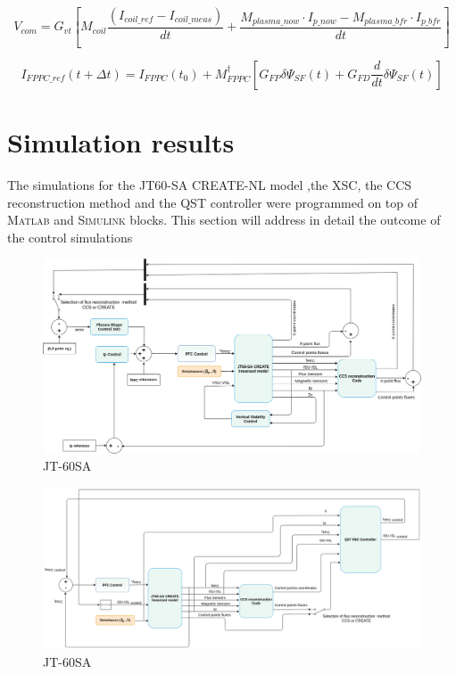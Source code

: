 \begin{equation}
V_{com}=G_{vt}\left[M_{coil}\frac{(I_{coil\_ref}-I_{coil\_meas})}{dt}+ \frac{M_{plasma\_now} \cdot I_{p\_now} - M_{plasma\_ bfr} \cdot I_{p\_bfr}}{dt}\right]
\end{equation}

\begin{equation}
I_{FPPC\_ref}(t+\Delta t)=I_{FPPC}(t_0)+ M^\dagger_{FPPC}\left[G_{FP}\delta \Psi_{SF}(t) + G_{FD}\frac{d}{dt}\delta\Psi_{SF}(t) \right]
\end{equation}





\section{Simulation results}	

 The simulations for  the JT60-SA CREATE-NL model ,the XSC, the CCS reconstruction method and the QST controller  were programmed on top of  \textsc{Matlab} and \textsc{Simulink} blocks. This  section will address in detail the outcome of the control simulations 
 
 
\begin{figure}
	\centering
	\includegraphics[width=1.05\textwidth]{Chp3/JT60Schemes1.png}
	\caption{	\label{JT60controlscheme}JT-60SA }
\end{figure}

\begin{figure}
	\centering
	\includegraphics[width=1.05\textwidth]{Chp3/JT60SchemeFBCnew.png}
	\caption{	\label{JT60FBCcheme}JT-60SA }
\end{figure}

